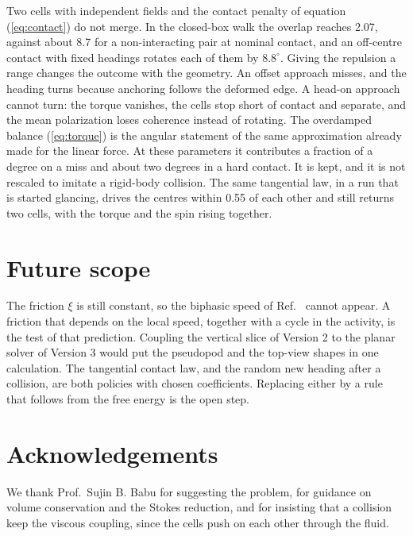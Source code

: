 \documentclass[11pt]{article}
\begin{document}
Two cells with independent fields and the contact penalty of equation (\ref{eq:contact}) do not merge. In the closed-box walk the overlap reaches 2.07, against about 8.7 for a non-interacting pair at nominal contact, and an off-centre contact with fixed headings rotates each of them by $8.8^{\circ}$. Giving the repulsion a range changes the outcome with the geometry. An offset approach misses, and the heading turns because anchoring follows the deformed edge. A head-on approach cannot turn: the torque vanishes, the cells stop short of contact and separate, and the mean polarization loses coherence instead of rotating. The overdamped balance (\ref{eq:torque}) is the angular statement of the same approximation already made for the linear force. At these parameters it contributes a fraction of a degree on a miss and about two degrees in a hard contact. It is kept, and it is not rescaled to imitate a rigid-body collision. The same tangential law, in a run that is started glancing, drives the centres within 0.55 of each other and still returns two cells, with the torque and the spin rising together.

\section{Future scope}
\label{sec:scope}
\noindent
The friction $\xi$ is still constant, so the biphasic speed of Ref.~\cite{Leoni:2017} cannot appear. A friction that depends on the local speed, together with a cycle in the activity, is the test of that prediction. Coupling the vertical slice of Version 2 to the planar solver of Version 3 would put the pseudopod and the top-view shapes in one calculation. The tangential contact law, and the random new heading after a collision, are both policies with chosen coefficients. Replacing either by a rule that follows from the free energy is the open step.

\section*{Acknowledgements}
We thank Prof.\ Sujin B. Babu for suggesting the problem, for guidance on volume conservation and the Stokes reduction, and for insisting that a collision keep the viscous coupling, since the cells push on each other through the fluid.
\end{document}
